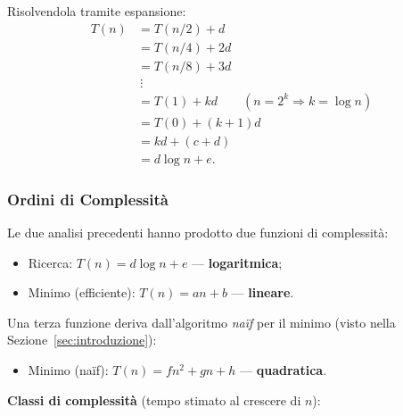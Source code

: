 \documentclass[12pt, a4paper]{article}
\begin{document}
Risolvendola tramite espansione:
\begin{align*}
T(n) &= T(n/2) + d \\
     &= T(n/4) + 2d \\
     &= T(n/8) + 3d \\
     &\ \vdots \\
     &= T(1) + kd \qquad (n = 2^k \Rightarrow k = \log n) \\
     &= T(0) + (k+1)d \\
     &= kd + (c+d) \\
     &= d\log n + e.
\end{align*}

\subsubsection{Ordini di Complessità}

Le due analisi precedenti hanno prodotto due funzioni di complessità:
\begin{itemize}
    \item Ricerca: $T(n) = d\log n + e$ \quad — \textcolor{green!50!black}{\textbf{logaritmica}};
    \item Minimo (efficiente): $T(n) = an+b$ \quad — \textcolor{green!50!black}{\textbf{lineare}}.
\end{itemize}
Una terza funzione deriva dall'algoritmo \emph{naïf} per il minimo (visto nella Sezione~\ref{sec:introduzione}):
\begin{itemize}
    \item Minimo (naïf): $T(n) = fn^2+gn+h$ \quad — \textcolor{orange!80!black}{\textbf{quadratica}}.
\end{itemize}

\textbf{Classi di complessità} (tempo stimato al crescere di $n$):
\end{document}
